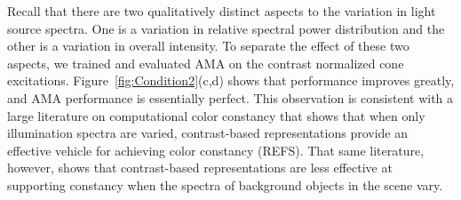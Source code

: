 \documentclass{jov}
\begin{document}
Recall that there are two qualitatively distinct aspects to the variation in light source spectra.
One is a variation in relative spectral power distribution and the
other is a variation in overall intensity.
To separate the effect of these two aspects, we trained and evaluated AMA on the contrast normalized cone excitations.
Figure~\ref{fig:Condition2}(c,d) shows that performance improves greatly, and AMA performance is essentially perfect.
This observation is consistent with a large literature on computational color constancy that shows that when only illumination spectra are varied,
contrast-based representations provide an effective vehicle for achieving color constancy (REFS).
That same literature, however, shows that
contrast-based representations are less effective at supporting constancy when the spectra of background objects in the scene vary.
\end{document}
